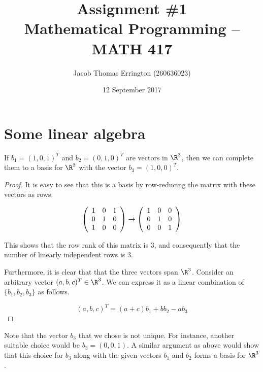 \documentclass[11pt,letterpaper]{article}
\author{Jacob Thomas Errington (260636023)}
\title{Assignment \#1\\Mathematical Programming -- MATH 417}
\date{12 September 2017}
\begin{document}
\maketitle

\section{Some linear algebra}

\begin{prop}
    If $b_1 = (1, 0, 1)^T$ and $b_2 = (0, 1, 0)^T$ are vectors in $\R^3$,
    then we can complete them to a basis for $\R^3$ with the vector
    $b_3 = (1, 0, 0)^T$.
\end{prop}

\begin{proof}
    It is easy to see that this is a basis by row-reducing the matrix with
    these vectors as rows.

    \begin{equation*}
        \left(\begin{array}{c c c}
            1 & 0 & 1 \\
            0 & 1 & 0 \\
            1 & 0 & 0
        \end{array}\right)
        \to
        \left(\begin{array}{c c c}
            1 & 0 & 0 \\
            0 & 1 & 0 \\
            0 & 0 & 1
        \end{array}\right)
    \end{equation*}

    This shows that the row rank of this matrix is $3$, and consequently
    that the number of linearly independent rows is $3$.

    Furthermore, it is clear that that the three vectors span $\R^3$.
    Consider an arbitrary vector $(a, b, c)^T \in \R^3$. We can express it
    as a linear combination of $\{b_1, b_2, b_3\}$ as follows.

    \begin{equation*}
        (a, b, c)^T = (a + c) b_1 + b b_2 - a b_3
    \end{equation*}
\end{proof}

\begin{rem*}
    Note that the vector $b_3$ that we chose is not unique.
    For instance, another suitable choice would be $b_3 = (0, 0, 1)$.
    A similar argument as above would show that this choice for $b_3$
    along with the given vectors $b_1$ and $b_2$ forms a basis for $\R^3$.
\end{rem*}
\end{document}
